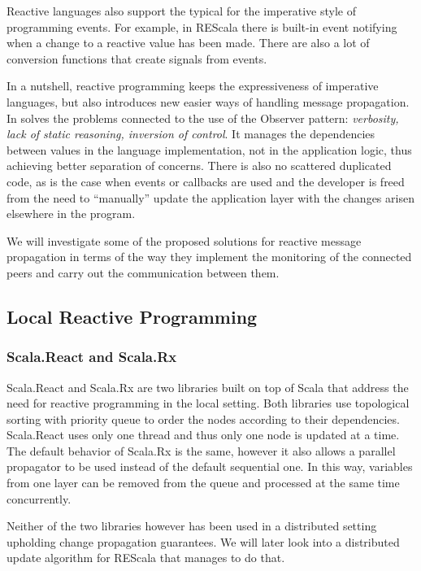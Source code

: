 \documentclass{sigplanconf}
\begin{document}
Reactive languages also support the typical for the imperative style of programming events. For example, in REScala \cite{rescala} there is built-in event notifying when a change to a reactive value has been made. There are also a lot of conversion functions that create signals from events.

In a nutshell, reactive programming keeps the expressiveness of imperative languages, but also introduces new easier ways of handling message propagation. In solves the problems connected to the use of the Observer pattern: \textit{verbosity, lack of static reasoning, inversion of control}. It manages the dependencies between values in the language implementation, not in the application logic, thus achieving better separation of concerns. There is also no scattered duplicated code, as is the case when events or callbacks are used and the developer is freed from the need to “manually” update the application layer with the changes arisen elsewhere in the program.

We will investigate some of the proposed solutions for reactive message propagation in terms of the way they implement the monitoring of the connected peers and carry out the communication between them.

\subsection{Local Reactive Programming}
\subsubsection{Scala.React and Scala.Rx}

Scala.React and Scala.Rx are two libraries built on top of Scala that address the need for reactive programming in the local setting. Both libraries use topological sorting with priority queue to order the nodes according to their dependencies. Scala.React uses only one thread and thus only one node is updated at a time. The default behavior of Scala.Rx is the same, however it also allows a parallel propagator to be used instead of the default sequential one. In this way, variables from one layer can be removed from the queue and processed at the same time concurrently. 

Neither of the two libraries however has been used in a distributed setting upholding change propagation guarantees. We will later look into a distributed update algorithm for REScala that manages to do that.
\end{document}
